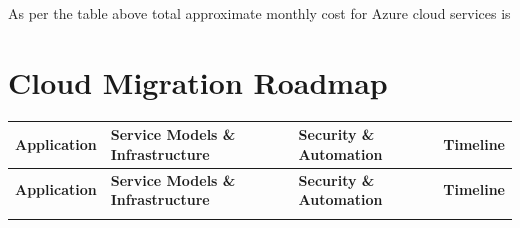 \documentclass{llncs}
\begin{document}
As per the table above total approximate monthly cost for Azure cloud services is 
\newpage
\section{Cloud Migration Roadmap}

\begin{longtable}{|p{3.1cm}|p{5.2cm}|p{3.1cm}|l|}
    \hline
    \textbf{Application} & \textbf{Service Models \& Infrastructure} & \textbf{Security \& Automation} & \textbf{Timeline} \\
    \hline
    \endfirsthead
    \hline
    \textbf{Application} & \textbf{Service Models \& Infrastructure} & \textbf{Security \& Automation} & \textbf{Timeline} \\
    \hline
    \endhead
    \hline
    \endfoot
    \hline
    

\end{longtable}
\end{document}
